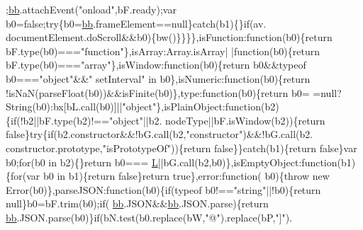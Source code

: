 \begin{DoxyCode}
      ;\hyperlink{jquery_8js_a1d6558865876e1c8cca029fce41a4bdb}{bb}.attachEvent(\textcolor{stringliteral}{"onload"},bF.ready);var b0=\textcolor{keyword}{false};\textcolor{keywordflow}{try}\{b0=\hyperlink{jquery_8js_a1d6558865876e1c8cca029fce41a4bdb}{bb}.frameElement==null\}\textcolor{keywordflow}{catch}(b1)\{\}\textcolor{keywordflow}{if}(av.
      documentElement.doScroll&&b0)\{bw()\}\}\}\},isFunction:\textcolor{keyword}{function}(b0)\{\textcolor{keywordflow}{return} bF.type(b0)===\textcolor{stringliteral}{"function"}\},isArray:Array.isArray|
      |\textcolor{keyword}{function}(b0)\{\textcolor{keywordflow}{return} bF.type(b0)===\textcolor{stringliteral}{"array"}\},isWindow:\textcolor{keyword}{function}(b0)\{\textcolor{keywordflow}{return} b0&&typeof b0===\textcolor{stringliteral}{"object"}&&\textcolor{stringliteral}{"
      setInterval"} in b0\},isNumeric:\textcolor{keyword}{function}(b0)\{\textcolor{keywordflow}{return} !isNaN(parseFloat(b0))&&isFinite(b0)\},type:\textcolor{keyword}{function}(b0)\{\textcolor{keywordflow}{return} b0=
      =null?String(b0):bx[bL.call(b0)]||\textcolor{stringliteral}{"object"}\},isPlainObject:\textcolor{keyword}{function}(b2)\{\textcolor{keywordflow}{if}(!b2||bF.type(b2)!==\textcolor{stringliteral}{"object"}||b2.
      nodeType||bF.isWindow(b2))\{\textcolor{keywordflow}{return} \textcolor{keyword}{false}\}\textcolor{keywordflow}{try}\{\textcolor{keywordflow}{if}(b2.constructor&&!bG.call(b2,\textcolor{stringliteral}{"constructor"})&&!bG.call(b2.
      constructor.prototype,\textcolor{stringliteral}{"isPrototypeOf"}))\{\textcolor{keywordflow}{return} \textcolor{keyword}{false}\}\}\textcolor{keywordflow}{catch}(b1)\{\textcolor{keywordflow}{return} \textcolor{keyword}{false}\}var b0;\textcolor{keywordflow}{for}(b0 in b2)\{\}\textcolor{keywordflow}{return} b0===
      \hyperlink{jquery_8js_a38ee4c0b5f4fe2a18d0c783af540d253}{L}||bG.call(b2,b0)\},isEmptyObject:\textcolor{keyword}{function}(b1)\{\textcolor{keywordflow}{for}(var b0 in b1)\{\textcolor{keywordflow}{return} \textcolor{keyword}{false}\}\textcolor{keywordflow}{return} \textcolor{keyword}{true}\},error:\textcolor{keyword}{function}(
      b0)\{\textcolor{keywordflow}{throw} \textcolor{keyword}{new} Error(b0)\},parseJSON:\textcolor{keyword}{function}(b0)\{\textcolor{keywordflow}{if}(typeof b0!==\textcolor{stringliteral}{"string"}||!b0)\{\textcolor{keywordflow}{return} null\}b0=bF.trim(b0);\textcolor{keywordflow}{if}(
      \hyperlink{jquery_8js_a1d6558865876e1c8cca029fce41a4bdb}{bb}.JSON&&\hyperlink{jquery_8js_a1d6558865876e1c8cca029fce41a4bdb}{bb}.JSON.parse)\{\textcolor{keywordflow}{return} \hyperlink{jquery_8js_a1d6558865876e1c8cca029fce41a4bdb}{bb}.JSON.parse(b0)\}\textcolor{keywordflow}{if}(bN.test(b0.replace(bW,\textcolor{stringliteral}{"@"}).replace(bP,\textcolor{stringliteral}{"]"}).

\end{DoxyCode}
